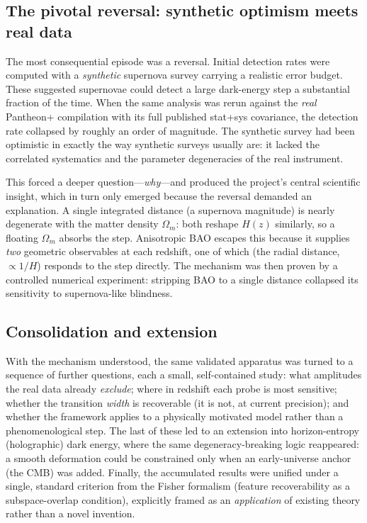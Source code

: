 \documentclass[11pt]{article}
\newcommand{\Om}{\Omega_m}
\begin{document}
\subsection{The pivotal reversal: synthetic optimism meets real data}

The most consequential episode was a reversal. Initial detection rates were
computed with a \emph{synthetic} supernova survey carrying a realistic error
budget. These suggested supernovae could detect a large dark-energy step a
substantial fraction of the time. When the same analysis was rerun against the
\emph{real} Pantheon+ compilation with its full published stat+sys covariance,
the detection rate collapsed by roughly an order of magnitude. The synthetic
survey had been optimistic in exactly the way synthetic surveys usually are: it
lacked the correlated systematics and the parameter degeneracies of the real
instrument.

This forced a deeper question---\emph{why}---and produced the project's central
scientific insight, which in turn only emerged because the reversal demanded an
explanation. A single integrated distance (a supernova magnitude) is nearly
degenerate with the matter density $\Om$: both reshape $H(z)$ similarly, so a
floating $\Om$ absorbs the step. Anisotropic BAO escapes this because it supplies
\emph{two} geometric observables at each redshift, one of which (the radial
distance, $\propto 1/H$) responds to the step directly. The mechanism was then
proven by a controlled numerical experiment: stripping BAO to a single distance
collapsed its sensitivity to supernova-like blindness.

\subsection{Consolidation and extension}

With the mechanism understood, the same validated apparatus was turned to a
sequence of further questions, each a small, self-contained study: what amplitudes
the real data already \emph{exclude}; where in redshift each probe is most
sensitive; whether the transition \emph{width} is recoverable (it is not, at
current precision); and whether the framework applies to a physically motivated
model rather than a phenomenological step. The last of these led to an extension
into horizon-entropy (holographic) dark energy, where the same
degeneracy-breaking logic reappeared: a smooth deformation could be constrained
only when an early-universe anchor (the CMB) was added. Finally, the accumulated
results were unified under a single, standard criterion from the Fisher formalism
(feature recoverability as a subspace-overlap condition), explicitly framed as an
\emph{application} of existing theory rather than a novel invention.
\end{document}
